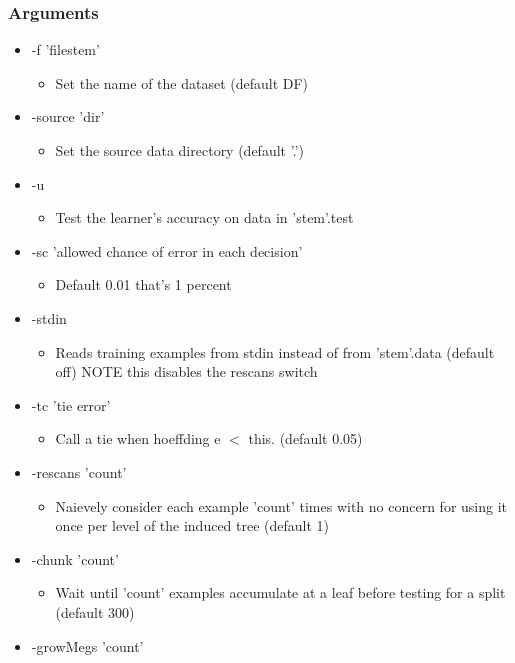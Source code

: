 \subsubsection*{Arguments}

\begin{itemize}
\item -f 'filestem'\begin{itemize}
\item Set the name of the dataset (default DF)\end{itemize}
\item -source 'dir'\begin{itemize}
\item Set the source data directory (default '.')\end{itemize}
\item -u\begin{itemize}
\item Test the learner's accuracy on data in 'stem'.test\end{itemize}
\item -sc 'allowed chance of error in each decision'\begin{itemize}
\item Default 0.01 that's 1 percent\end{itemize}
\item -stdin\begin{itemize}
\item Reads training examples from stdin instead of from 'stem'.data (default off) NOTE this disables the rescans switch\end{itemize}
\item -tc 'tie error'\begin{itemize}
\item Call a tie when hoeffding e $<$ this. (default 0.05)\end{itemize}
\item -rescans 'count'\begin{itemize}
\item Naievely consider each example 'count' times with no concern for using it once per level of the induced tree (default 1)\end{itemize}
\item -chunk 'count'\begin{itemize}
\item Wait until 'count' examples accumulate at a leaf before testing for a split (default 300)\end{itemize}
\item -grow\-Megs 'count'\begin{itemize}

\end{itemize}
\end{itemize}
